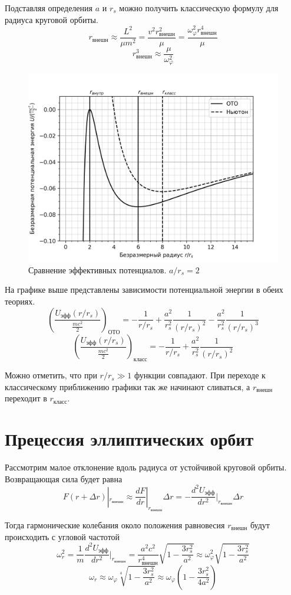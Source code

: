 \documentclass[14pt, a4paper]{report}
\begin{document}
Подставляя определения $a$ и $r_s$ можно получить классическую формулу для радиуса круговой орбиты. 
\[r_{внешн}\approx\frac{L^2}{\mu m^2}=\frac{v^2 r_{внешн}^2}{\mu}=\frac{\omega_\varphi^2 r_{внешн}^4}{\mu}\]
\[r_{внешн}^3\approx\frac{\mu}{\omega_\varphi^2}\]

\begin{figure}[H]
\centering
\includegraphics[width=0.7\linewidth]{../images/mc-2}
\caption{Сравнение эффективных потенциалов. $a/r_s=2$}
\end{figure}

На графике выше представлены зависимости потенциальной энергии в обеих теориях. 
\[\left(\frac{U_{эфф}(r/r_s)}{\frac{mc^2}{2}}\right)_{ОТО}=-\frac{1}{r/r_s}+\frac{a^2}{r_s^2}\frac{1}{(r/r_s)^2}-\frac{a^2}{r_s^2}\frac{1}{(r/r_s)^3}\]
\[\left(\frac{U_{эфф}(r/r_s)}{\frac{mc^2}{2}}\right)_{класс}=-\frac{1}{r/r_s}+\frac{a^2}{r_s^2}\frac{1}{(r/r_s)^2}\]

Можно отметить, что при $r/r_s\gg 1$ функции совпадают. При переходе к классическому приближению графики так же начинают сливаться, а $r_{внешн}$ переходит в $r_{класс}$.

\section{Прецессия эллиптических орбит}

Рассмотрим малое отклонение вдоль радиуса от устойчивой круговой орбиты.
Возвращающая сила будет равна
\[F(r+\Delta r)|_{r_{внешн}}\approx\frac{dF}{dr}|_{r_{внешн}}\Delta r=-\frac{d^2 U_{эфф}}{dr^2}|_{r_{внешн}}\Delta r\]

Тогда гармонические колебания около положения равновесия $r_{внешн}$ будут происходить с угловой частотой
\[\omega_r^2=\frac{1}{m}\frac{d^2 U_{эфф}}{dr^2}|_{r_{внешн}}=\frac{a^2 c^2}{r_{внешн}^4}\sqrt{1-\frac{3r_s^2}{a^2}}\approx\omega_\varphi^2\sqrt{1-\frac{3r_s^2}{a^2}}\]
\[\omega_r\approx\omega_\varphi\sqrt[4]{1-\frac{3r_s^2}{a^2}}\approx\omega_\varphi\left(1-\frac{3r_s^2}{4a^2}\right)\]
\end{document}
